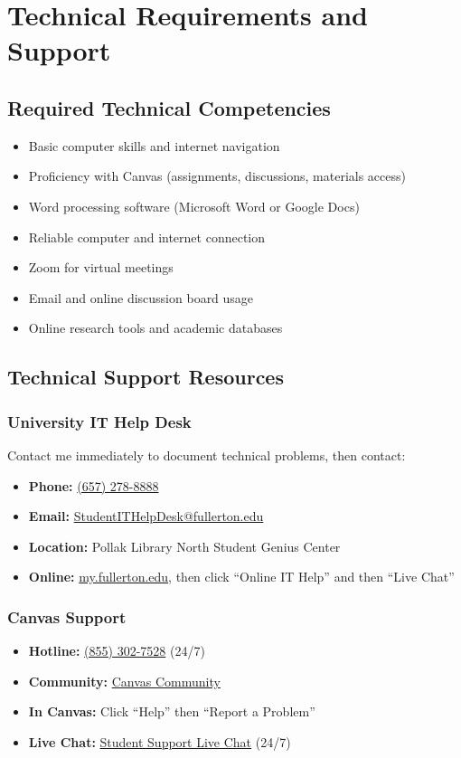 \documentclass[11pt]{scrartcl} %
\begin{document}
\section{Technical Requirements and Support}

\subsection{Required Technical Competencies}
\begin{itemize}
\item Basic computer skills and internet navigation
\item Proficiency with Canvas (assignments, discussions, materials access)
\item Word processing software (Microsoft Word or Google Docs)
\item Reliable computer and internet connection
\item Zoom for virtual meetings
\item Email and online discussion board usage
\item Online research tools and academic databases
\end{itemize}

\subsection{Technical Support Resources}

\subsubsection{University IT Help Desk}
Contact me immediately to document technical problems, then contact:
\begin{itemize}
\item \textbf{Phone:} \href{tel:+16572788888}{(657) 278-8888}
\item \textbf{Email:} \href{mailto:StudentITHelpDesk@fullerton.edu}{StudentITHelpDesk@fullerton.edu}
\item \textbf{Location:} Pollak Library North Student Genius Center
\item \textbf{Online:} \href{http://my.fullerton.edu/}{my.fullerton.edu}, then click ``Online IT Help'' and then ``Live Chat''
\end{itemize}

\subsubsection{Canvas Support}
\begin{itemize}
\item \textbf{Hotline:} \href{tel:+18553027528}{(855) 302-7528} (24/7)
\item \textbf{Community:} \href{https://community.canvaslms.com/docs/DOC-10720-67952720329}{Canvas Community}
\item \textbf{In Canvas:} Click ``Help'' then ``Report a Problem''
\item \textbf{Live Chat:} \href{https://cases.canvaslms.com/liveagentchat?chattype=student&sfid=001A000000YzcwQIAR}{Student Support Live Chat} (24/7)
\end{itemize}
\end{document}
